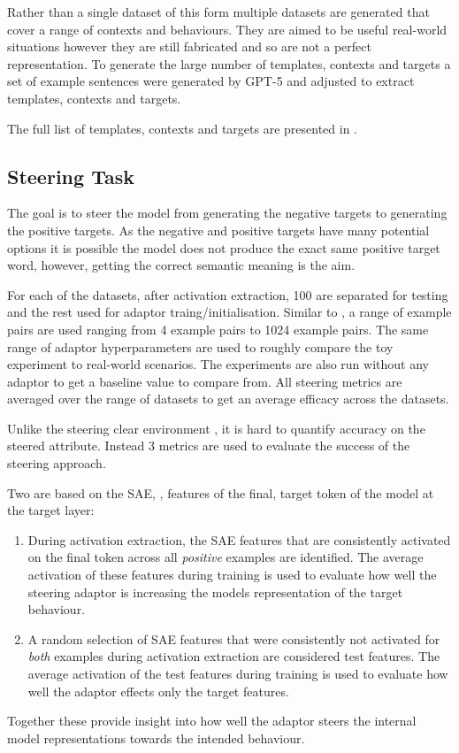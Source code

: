 Rather than a single dataset of this form multiple datasets are generated that cover a range of contexts and behaviours.
They are aimed to be useful real-world situations however they are still fabricated and so are not a perfect representation.
To generate the large number of templates, contexts and targets a set of example sentences were generated by GPT-5 \citep{gpt-5} and adjusted to extract templates, contexts and targets.

The full list of templates, contexts and targets are presented in .

\subsection{Steering Task}

The goal is to steer the model from generating the negative targets to generating the positive targets.
As the negative and positive targets have many potential options it is possible the model does not produce the exact same positive target word, however, getting the correct semantic meaning is the aim.

For each of the datasets, after activation extraction, 100 are separated for testing and the rest used for adaptor traing/initialisation.
Similar to \citet{steering-clear}, a range of example pairs are used ranging from 4 example pairs to 1024 example pairs.
The same range of adaptor hyperparameters are used to roughly compare the toy experiment to real-world scenarios.
The experiments are also run without any adaptor to get a baseline value to compare from.
All steering metrics are averaged over the range of datasets to get an average efficacy across the datasets.

 Unlike the steering clear environment , it is hard to quantify accuracy on the steered attribute.
Instead 3 metrics are used to evaluate the success of the steering approach.

Two are based on the SAE, , features of the final, target token of the model at the target layer:
\begin{enumerate}[nolistsep]
    \item During activation extraction, the SAE features that are consistently activated on the final token across all \emph{positive} examples are identified.
        The average activation of these features during training is used to evaluate how well the steering adaptor is increasing the models representation of the target behaviour.
    \item A random selection of SAE features that were consistently not activated for \emph{both} examples during activation extraction are considered test features.
        The average activation of the test features during training is used to evaluate how well the adaptor effects only the target features.
\end{enumerate}
Together these provide insight into how well the adaptor steers the internal model representations towards the intended behaviour.

